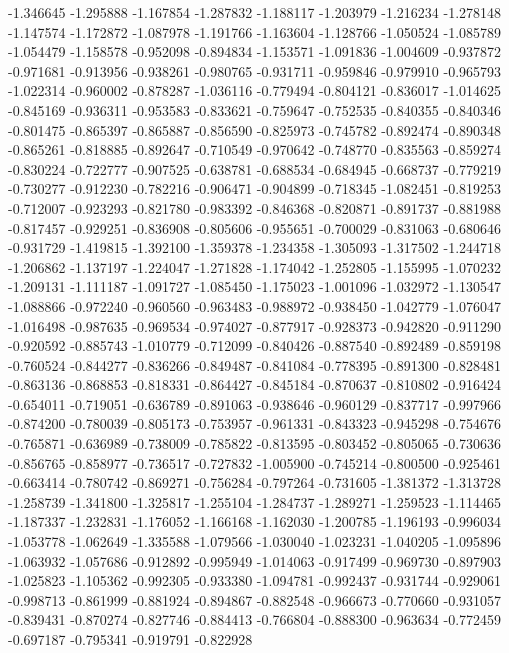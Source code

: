 -1.346645
-1.295888
-1.167854
-1.287832
-1.188117
-1.203979
-1.216234
-1.278148
-1.147574
-1.172872
-1.087978
-1.191766
-1.163604
-1.128766
-1.050524
-1.085789
-1.054479
-1.158578
-0.952098
-0.894834
-1.153571
-1.091836
-1.004609
-0.937872
-0.971681
-0.913956
-0.938261
-0.980765
-0.931711
-0.959846
-0.979910
-0.965793
-1.022314
-0.960002
-0.878287
-1.036116
-0.779494
-0.804121
-0.836017
-1.014625
-0.845169
-0.936311
-0.953583
-0.833621
-0.759647
-0.752535
-0.840355
-0.840346
-0.801475
-0.865397
-0.865887
-0.856590
-0.825973
-0.745782
-0.892474
-0.890348
-0.865261
-0.818885
-0.892647
-0.710549
-0.970642
-0.748770
-0.835563
-0.859274
-0.830224
-0.722777
-0.907525
-0.638781
-0.688534
-0.684945
-0.668737
-0.779219
-0.730277
-0.912230
-0.782216
-0.906471
-0.904899
-0.718345
-1.082451
-0.819253
-0.712007
-0.923293
-0.821780
-0.983392
-0.846368
-0.820871
-0.891737
-0.881988
-0.817457
-0.929251
-0.836908
-0.805606
-0.955651
-0.700029
-0.831063
-0.680646
-0.931729
-1.419815
-1.392100
-1.359378
-1.234358
-1.305093
-1.317502
-1.244718
-1.206862
-1.137197
-1.224047
-1.271828
-1.174042
-1.252805
-1.155995
-1.070232
-1.209131
-1.111187
-1.091727
-1.085450
-1.175023
-1.001096
-1.032972
-1.130547
-1.088866
-0.972240
-0.960560
-0.963483
-0.988972
-0.938450
-1.042779
-1.076047
-1.016498
-0.987635
-0.969534
-0.974027
-0.877917
-0.928373
-0.942820
-0.911290
-0.920592
-0.885743
-1.010779
-0.712099
-0.840426
-0.887540
-0.892489
-0.859198
-0.760524
-0.844277
-0.836266
-0.849487
-0.841084
-0.778395
-0.891300
-0.828481
-0.863136
-0.868853
-0.818331
-0.864427
-0.845184
-0.870637
-0.810802
-0.916424
-0.654011
-0.719051
-0.636789
-0.891063
-0.938646
-0.960129
-0.837717
-0.997966
-0.874200
-0.780039
-0.805173
-0.753957
-0.961331
-0.843323
-0.945298
-0.754676
-0.765871
-0.636989
-0.738009
-0.785822
-0.813595
-0.803452
-0.805065
-0.730636
-0.856765
-0.858977
-0.736517
-0.727832
-1.005900
-0.745214
-0.800500
-0.925461
-0.663414
-0.780742
-0.869271
-0.756284
-0.797264
-0.731605
-1.381372
-1.313728
-1.258739
-1.341800
-1.325817
-1.255104
-1.284737
-1.289271
-1.259523
-1.114465
-1.187337
-1.232831
-1.176052
-1.166168
-1.162030
-1.200785
-1.196193
-0.996034
-1.053778
-1.062649
-1.335588
-1.079566
-1.030040
-1.023231
-1.040205
-1.095896
-1.063932
-1.057686
-0.912892
-0.995949
-1.014063
-0.917499
-0.969730
-0.897903
-1.025823
-1.105362
-0.992305
-0.933380
-1.094781
-0.992437
-0.931744
-0.929061
-0.998713
-0.861999
-0.881924
-0.894867
-0.882548
-0.966673
-0.770660
-0.931057
-0.839431
-0.870274
-0.827746
-0.884413
-0.766804
-0.888300
-0.963634
-0.772459
-0.697187
-0.795341
-0.919791
-0.822928
